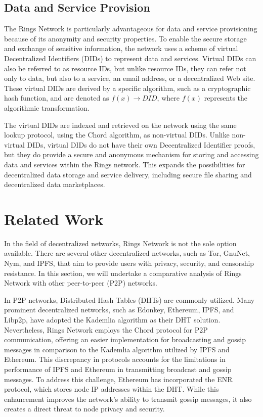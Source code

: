 \documentclass[twocolumn]{article}
\begin{document}
\subsection{Data and Service Provision}

The Rings Network is particularly advantageous for data and service provisioning because of its anonymity and security properties. To enable the secure storage and exchange of sensitive information, the network uses a scheme of virtual Decentralized Identifiers (DIDs) to represent data and services. Virtual DIDs can also be referred to as resource IDs, but unlike resource IDs, they can refer not only to data, but also to a service, an email address, or a decentralized Web site.
These virtual DIDs are derived by a specific algorithm, such as a cryptographic hash function, and are denoted as $f(x) \rightarrow DID$, where $f(x)$ represents the algorithmic transformation.

The virtual DIDs are indexed and retrieved on the network using the same lookup protocol, using the Chord algorithm, as non-virtual DIDs. Unlike non-virtual DIDs, virtual DIDs do not have their own Decentralized Identifier proofs, but they do provide a secure and anonymous mechanism for storing and accessing data and services within the Rings network. This expands the possibilities for decentralized data storage and service delivery, including secure file sharing and decentralized data marketplaces.

\section{Related Work}
In the field of decentralized networks, Rings Network is not the sole option available. There are several other decentralized networks, such as Tor, GnuNet, Nym, and IPFS, that aim to provide users with privacy, security, and censorship resistance. In this section, we will undertake a comparative analysis of Rings Network with other peer-to-peer (P2P) networks.

In P2P networks, Distributed Hash Tables (DHTs\cite{DHT}) are commonly utilized. Many prominent decentralized networks, such as Edonkey\cite{Edonkey}, Ethereum\cite{Ethereum}, IPFS\cite{IPFS}, and Libp2p\cite{Libp2p}, have adopted the Kademlia\cite{Kademlia} algorithm as their DHT solution. Nevertheless, Rings Network employs the Chord protocol for P2P communication, offering an easier implementation for broadcasting and gossip messages in comparison to the Kademlia algorithm utilized by IPFS and Ethereum. This discrepancy in protocols accounts for the limitations in performance of IPFS and Ethereum in transmitting broadcast and gossip messages. To address this challenge, Ethereum has incorporated the ENR protocol, which stores node IP addresses within the DHT. While this enhancement improves the network's ability to transmit gossip messages, it also creates a direct threat to node privacy and security.
\end{document}
